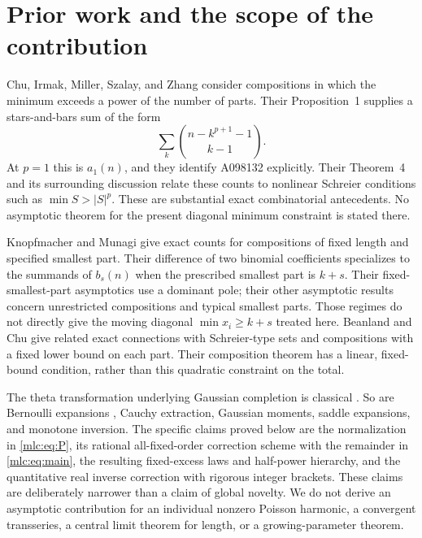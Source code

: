 \documentclass[11pt]{article}
\theoremstyle{remark}\newtheorem{remark}[theorem]{Remark}
\begin{document}
\section{Prior work and the scope of the contribution}\label{mlc:sec:prior}
Chu, Irmak, Miller, Szalay, and Zhang \cite{chu} consider compositions in which the minimum exceeds a power of the number of parts. Their Proposition~1 supplies a stars-and-bars sum of the form
\[
 \sum_k\binom{n-k^{p+1}-1}{k-1}.
\]
At $p=1$ this is $a_1(n)$, and they identify A098132 explicitly. Their Theorem~4 and its surrounding discussion relate these counts to nonlinear Schreier conditions such as $\min S>|S|^p$. These are substantial exact combinatorial antecedents. No asymptotic theorem for the present diagonal minimum constraint is stated there.

Knopfmacher and Munagi \cite{smallest} give exact counts for compositions of fixed length and specified smallest part. Their difference of two binomial coefficients specializes to the summands of $b_s(n)$ when the prescribed smallest part is $k+s$. Their fixed-smallest-part asymptotics use a dominant pole; their other asymptotic results concern unrestricted compositions and typical smallest parts. Those regimes do not directly give the moving diagonal $\min x_i\ge k+s$ treated here. Beanland and Chu \cite{beanland} give related exact connections with Schreier-type sets and compositions with a fixed lower bound on each part. Their composition theorem has a linear, fixed-bound condition, rather than this quadratic constraint on the total.

The theta transformation underlying Gaussian completion is classical \cite{dlmfTheta}. So are Bernoulli expansions \cite{dlmfBernoulli}, Cauchy extraction, Gaussian moments, saddle expansions, and monotone inversion. The specific claims proved below are the normalization in \eqref{mlc:eq:P}, its rational all-fixed-order correction scheme with the remainder in \eqref{mlc:eq:main}, the resulting fixed-excess laws and half-power hierarchy, and the quantitative real inverse correction with rigorous integer brackets. These claims are deliberately narrower than a claim of global novelty. We do not derive an asymptotic contribution for an individual nonzero Poisson harmonic, a convergent transseries, a central limit theorem for length, or a growing-parameter theorem.
\end{document}
